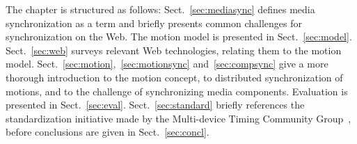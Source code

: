 The chapter is structured as follows: Sect.~\ref{sec:mediasync} defines media
synchronization as a term and briefly presents common challenges for
synchronization on the Web. The motion model is presented in
Sect.~\ref{sec:model}. Sect.~\ref{sec:web} surveys relevant Web technologies,
relating them to the motion model.
Sect.~\ref{sec:motion},~\ref{sec:motionsync} and~\ref{sec:compsync} give a
more thorough introduction to the motion concept, to distributed
synchronization of motions, and to the challenge of synchronizing media
components. Evaluation is presented in Sect.~\ref{sec:eval}.
Sect.~\ref{sec:standard} briefly references the standardization initiative
made by the Multi-device Timing Community Group~\cite{mtcg}, before
conclusions are given in Sect.~\ref{sec:concl}.
